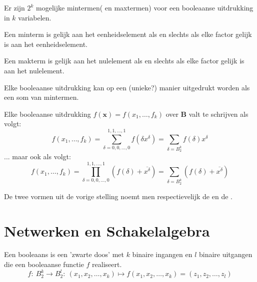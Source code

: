 \documentclass[main.tex]{subfiles}
\begin{document}
\begin{opm}
  Er zijn $2^{k}$ mogelijke mintermen( en maxtermen) voor een booleaanse uitdrukking in $k$ variabelen.
\end{opm}

\begin{ei}
  Een minterm is gelijk aan het eenheidselement als en slechts als elke factor gelijk is aan het eenheidselement.
\end{ei}

\begin{ei}
  Een makterm is gelijk aan het nulelement als en slechts als elke factor gelijk is aan het nulelement.
\end{ei}

\begin{st}
  Elke booleaanse uitdrukking kan op een (unieke?) manier uitgedrukt worden als een som van mintermen.
\end{st}

\begin{st}
  Elke booleaanse uitdrukking $f(\mathbf{x}) = f(x_{1},\dotsc,f_{k})$ over $\mathbf{B}$ valt te schrijven als volgt:
  \[ f(x_{1},\dotsc,f_{k}) = \sum_{\delta = 0,0,\dotsc,0}^{1,1,\dotsc,1}f(\delta x^{\delta}) = \sum_{\delta = B_{2}^{k}}f(\delta)x^{\delta} \]
  ... maar ook als volgt:
  \[ f(x_{1},\dotsc,f_{k}) = \prod_{\delta = 0,0,\dotsc,0}^{1,1,\dotsc,1}(f(\delta) + \overline{x^{\delta}}) = \sum_{\delta = B_{2}^{k}}(f(\delta) + \overline{x^{\delta}}) \]
\end{st}

\begin{de}
  De twee vormen uit de vorige stelling noemt men respectievelijk de  en de .
\end{de}

\section{Netwerken en Schakelalgebra}
\label{sec:netw-en-schak}

\begin{de}
  Een booleaans  is een 'zwarte doos' met $k$ binaire ingangen en $l$ binaire uitgangen die een booleaanse functie $f$ realiseert.
  \[ f:\ B_{2}^{k} \rightarrow B_{2}^{l}:\ (x_{1},x_{2},\dotsc,x_{k}) \mapsto f(x_{1},x_{2},\dotsc,x_{k}) = (z_{1},z_{2},\dotsc,z_{l})\]
\end{de}
\end{document}
